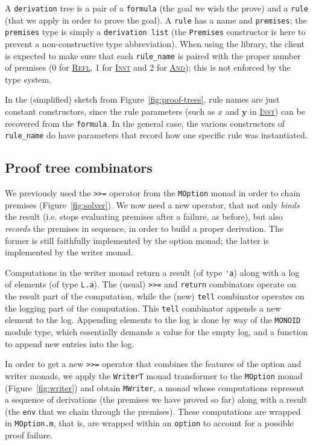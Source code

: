 \documentclass{easychair}
\def\li{\lstinline}
\let\TirName\textsc
\renewcommand{\DefTirName}[1]{\hyperlink{#1}{\TirName {#1}}}
\let\Rule\DefTirName
\newcommand{\fref}[1]{Figure~\ref{fig:#1}}
\newcommand{\f}[1]{\ensuremath{\mathbf{#1}}} %
\begin{document}
A \li+derivation+ tree is a pair of a \li+formula+ (the goal we wish the prove)
and a \li+rule+ (that we apply in order to prove the goal). A \li+rule+ has a name
and \li+premises+; the \li+premises+ type is simply a \li+derivation list+ (the
\li+Premises+ constructor is here to prevent a non-constructive type
abbreviation). When using the library, the client is expected to make sure
that each \li+rule_name+ is paired with the proper
number of premises (0 for \Rule{Refl}, 1 for
\Rule{Inst} and 2 for \Rule{And}); this is not enforced by the type system.

In the (simplified) sketch from \fref{proof-trees}, rule names are just constant
constructors, since the rule parameters (such as $x$ and $\f y$ in \Rule{Inst})
can be recovered from the \li+formula+. In the general case, the various
constructors of \li+rule_name+ do have parameters that record how one specific
rule was instantiated.

\subsection{Proof tree combinators}

We previously used the \li+>>=+ operator from the \li+MOption+ monad in order to
chain premises (\fref{solver}). We now need a new operator, that not only
\emph{binds} the result (i.e. stops evaluating premises after a failure, as
before), but also \emph{records} the premises in sequence, in order to build a
proper derivation. The former is still faithfully implemented by the option
monad; the latter is implemented by the writer monad.

Computations in the writer monad return a result (of type \li+'a+) along with a log of
elements (of type \li+L.a+). The (usual) \li+>>=+ and \li+return+ combinators operate on
the result part of the computation, while the (new) \li+tell+ combinator
operates on the logging part of the computation. This \li+tell+ combinator
appends a new element to the log. Appending elements to the log is done by way of the \li+MONOID+
module type, which essentially demands a value for the empty log, and a function to
append new entries into the log.

In order to get a new \li+>>=+ operator that combines the features of
the option and writer monads, we apply the \li+WriterT+ monad transformer to the
\li+MOption+ monad (\fref{writer}) and obtain \li+MWriter+, a monad whose
computations represent a sequence of derivations (the premises we have proved so far)
along with a result (the \li+env+ that we chain through the premises). These
computations are wrapped in \li+MOption.m+, that is, are wrapped within an
\li+option+ to account for a possible proof failure.
\end{document}
